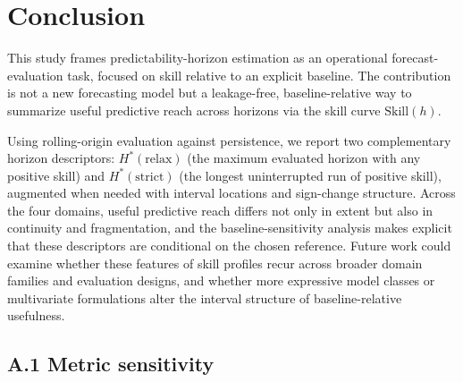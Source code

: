\documentclass[pdflatex]{sn-jnl}
\begin{document}
\section{Conclusion}

This study frames predictability-horizon estimation as an operational
forecast-evaluation task, focused on skill relative to an explicit
baseline. The contribution is not a new forecasting model but a
leakage-free, baseline-relative way to summarize useful predictive reach
across horizons via the skill curve $\mathrm{Skill}(h)$.

Using rolling-origin evaluation against persistence, we report two
complementary horizon descriptors: $H^*(\mathrm{relax})$ (the maximum
evaluated horizon with any positive skill) and $H^*(\mathrm{strict})$
(the longest uninterrupted run of positive skill), augmented when needed
with interval locations and sign-change structure. Across the four
domains, useful predictive reach differs not only in extent but also in
continuity and fragmentation, and the baseline-sensitivity analysis makes
explicit that these descriptors are conditional on the chosen reference.
Future work could examine whether these
features of skill profiles recur across broader
domain families and evaluation designs, and whether more expressive model
classes or multivariate formulations alter the interval structure of
baseline-relative usefulness.

\appendix

\subsection*{A.1 Metric sensitivity}
\end{document}
